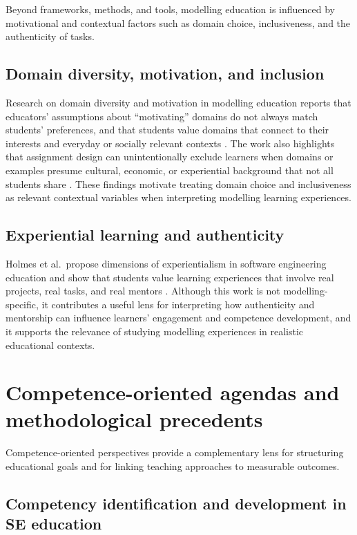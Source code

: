 Beyond frameworks, methods, and tools, modelling education is influenced by motivational and contextual factors such as domain choice, inclusiveness, and the authenticity of tasks.

\subsection{Domain diversity, motivation, and inclusion}
\label{subsec:rw_domain_diversity}

Research on domain diversity and motivation in modelling education reports that educators' assumptions about ``motivating'' domains do not always match students' preferences, and that students value domains that connect to their interests and everyday or socially relevant contexts \cite{grassl2026dei}. The work also highlights that assignment design can unintentionally exclude learners when domains or examples presume cultural, economic, or experiential background that not all students share \cite{grassl2026dei}. These findings motivate treating domain choice and inclusiveness as relevant contextual variables when interpreting modelling learning experiences.

\subsection{Experiential learning and authenticity}
\label{subsec:rw_experientialism}

Holmes et al.\ propose dimensions of experientialism in software engineering education and show that students value learning experiences that involve real projects, real tasks, and real mentors \cite{holmes2018dimensions}. Although this work is not modelling-specific, it contributes a useful lens for interpreting how authenticity and mentorship can influence learners' engagement and competence development, and it supports the relevance of studying modelling experiences in realistic educational contexts.

\section{Competence-oriented agendas and methodological precedents}
\label{sec:rw_competence_methods}

Competence-oriented perspectives provide a complementary lens for structuring educational goals and for linking teaching approaches to measurable outcomes.

\subsection{Competency identification and development in SE education}
\label{subsec:rw_evelin}

